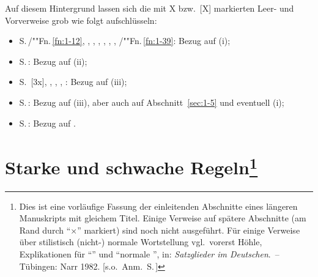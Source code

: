 \documentclass[output=paper]{langsci/langscibook}
\begin{document}
Auf diesem Hintergrund lassen sich die mit X bzw.\ [X] markierten Leer- und Vorverweise grob wie folgt aufschlüsseln:
\begin{itemize}
		\item  S.\,\pageref{fn:1-12}/""Fn.\,\ref{fn:1-12}, \pageref{X:1}, \pageref{X:2},
                  \pageref{X:10}, \pageref{X:3}, \pageref{X:4}, \pageref{ex:1-8.1-20b},
                  \pageref{fn:1-39}/""Fn.\,\ref{fn:1-39}: Bezug auf (i);
		\item S.\,\pageref{ex:1-8.2-3b}: Bezug auf (ii);
		\item S.\,\pageref{ex:1-1-5} [3x], \pageref{fn:1-15}, \pageref{X:5}, \pageref{X:6}, \pageref{X:7}: Bezug auf (iii);
		\item S.\,\pageref{X:8}: Bezug auf (iii), aber auch auf Abschnitt~\ref{sec:1-5} und eventuell (i);
		\item S.\,\pageref{X:9}: Bezug auf \citet{Hoehle78a}.
\end{itemize}
\printbibliography[heading=subbibliography]%

\newrefsection


\maketitle
\label{chap-topo-hoehles-content}
\label{chap:1}\label{chap-topo}

\renewcommand*{\thefootnote}{\fnsymbol{footnote}}
\setcounter{footnote}{0}


\section[Starke und schwache Regeln]{Starke und schwache Regeln\protect\footnote{\label{fn-autor-topo}Dies ist eine vorläufige Fassung der einleitenden Abschnitte eines
		längeren Manuskripts mit gleichem Titel. Einige Verweise auf spätere
		Abschnitte (am Rand durch "`×"' markiert) sind noch nicht
		ausgeführt. Für einige Verweise über stilistisch (nicht-) normale
		Wortstellung vgl.\ vorerst Höhle, Explikationen für "`"'
		und "`normale "', in: \textit{Satzglieder im Deutschen}.~– Tübingen:
		Narr 1982. [s.o.\ Anm.\ S.\,\pageref{fn-herausgeber-topo}]} }\label{sec:1-1}


\renewcommand*{\thefootnote}{\arabic{footnote}}
\setcounter{footnote}{0}

\ssubsection{}%
\label{subsec:1-1.1}
\end{document}
